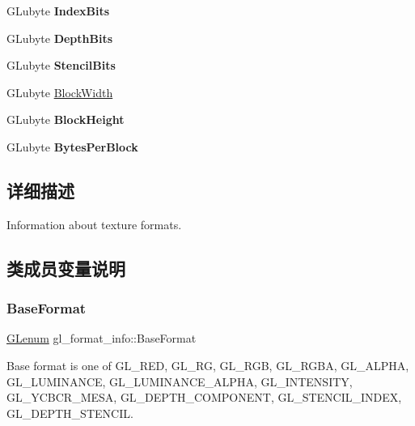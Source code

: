 \begin{DoxyCompactItemize}
\item 
\mbox{\label{structgl__format__info_a6c3d16c552f29d8442f6221048185f69}} 
G\+Lubyte {\bfseries Index\+Bits}
\item 
\mbox{\label{structgl__format__info_a08168c2308dd14b553eb2926e2141147}} 
G\+Lubyte {\bfseries Depth\+Bits}
\item 
\mbox{\label{structgl__format__info_a4247edfe5d9b89b7aca28d296a1a867c}} 
G\+Lubyte {\bfseries Stencil\+Bits}
\item 
G\+Lubyte \hyperlink{structgl__format__info_a2b8fde3187e2bc56529791f8241ab7e5}{Block\+Width}
\item 
\mbox{\label{structgl__format__info_a65642c982f0b50394b0f06e9ee676ca9}} 
G\+Lubyte {\bfseries Block\+Height}
\item 
\mbox{\label{structgl__format__info_aaf321e6b56f9f5f910797ac837d57e77}} 
G\+Lubyte {\bfseries Bytes\+Per\+Block}
\end{DoxyCompactItemize}


\subsection{详细描述}
Information about texture formats. 

\subsection{类成员变量说明}
\mbox{\label{structgl__format__info_aa6d0320deffa06cbe0b6ffcca460fcb4}} 
\subsubsection{\texorpdfstring{Base\+Format}{BaseFormat}}
{\footnotesize\ttfamily \hyperlink{interfacevoid}{G\+Lenum} gl\+\_\+format\+\_\+info\+::\+Base\+Format}

Base format is one of G\+L\+\_\+\+R\+ED, G\+L\+\_\+\+RG, G\+L\+\_\+\+R\+GB, G\+L\+\_\+\+R\+G\+BA, G\+L\+\_\+\+A\+L\+P\+HA, G\+L\+\_\+\+L\+U\+M\+I\+N\+A\+N\+CE, G\+L\+\_\+\+L\+U\+M\+I\+N\+A\+N\+C\+E\+\_\+\+A\+L\+P\+HA, G\+L\+\_\+\+I\+N\+T\+E\+N\+S\+I\+TY, G\+L\+\_\+\+Y\+C\+B\+C\+R\+\_\+\+M\+E\+SA, G\+L\+\_\+\+D\+E\+P\+T\+H\+\_\+\+C\+O\+M\+P\+O\+N\+E\+NT, G\+L\+\_\+\+S\+T\+E\+N\+C\+I\+L\+\_\+\+I\+N\+D\+EX, G\+L\+\_\+\+D\+E\+P\+T\+H\+\_\+\+S\+T\+E\+N\+C\+IL. \mbox{\label{structgl__format__info_a2b8fde3187e2bc56529791f8241ab7e5}} 
